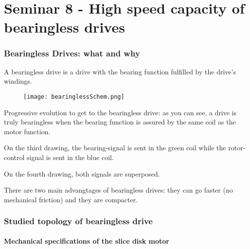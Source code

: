 \part{Seminar 8 - High speed capacity of bearingless drives}


\section{Bearingless Drives: what and why}
A bearingless drive is a drive with the bearing function fulfilled by the drive's windings. 

\begin{figure}[H]
    \centering
    \texttt{[image: bearinglessSchem.png]}
\end{figure}

Progressive evolution to get to the bearingless drive: as you can see, a drive is truly bearingless when the bearing function is assured by the same coil as the motor function. 

On the third drawing, the bearing-signal is sent in the green coil while the rotor-control signal is sent in the blue coil. 

On the fourth drawing, both signals are superposed.

There are two main advangtages of bearingless drives: they can go faster (no mechanical friction) and they are compacter. 

\section{Studied topology of bearingless drive}
\subsection{Mechanical specifications of the slice disk motor}
